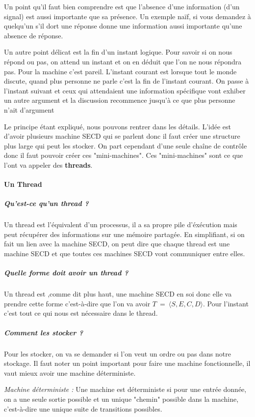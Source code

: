 \documentclass[10pt,a4paper]{article}
\begin{document}
				Un point qu'il faut bien comprendre est que l'absence d'une information (d'un signal) est aussi importante que sa présence. Un exemple naïf, si vous demandez à quelqu'un s'il dort une réponse donne une information aussi importante qu'une absence de réponse.
				\medbreak
					
				Un autre point délicat est la fin d'un instant logique. Pour savoir si on nous répond ou pas, on attend un instant et on en déduit que l'on ne nous répondra pas. Pour la machine c'est pareil. L'instant courant est lorsque tout le monde discute, quand plus personne ne parle c'est la fin de l'instant courant. On passe à l'instant suivant et ceux qui attendaient une information spécifique vont exhiber un autre argument et la discussion recommence jusqu'à ce que plus personne n'ait d'argument
				\medbreak
					
				Le principe étant expliqué, nous pouvons rentrer dans les détails. L'idée est d'avoir plusieurs machine SECD qui se parlent donc il faut créer une structure plus large qui peut les stocker. On part cependant d'une seule chaîne de contrôle donc il faut pouvoir créer ces "mini-machines". Ces "mini-machines" sont ce que l'ont va appeler des \textbf{threads}.
				\bigbreak
					
					
				\paragraph{Un Thread}
						
					\subparagraph{Qu'est-ce qu'un thread ?}
					Un thread est l'équivalent d'un processus, il a sa propre pile d'éxécution mais peut récupérer des informations sur une mémoire partagée. En simplifiant, si on fait un lien avec la machine SECD, on peut dire que chaque thread est une machine SECD et que toutes ces machines SECD vont communiquer entre elles.
						
					\subparagraph{Quelle forme doit avoir un thread ?} 
					Un thread est ,comme dit plus haut, une machine SECD en soi donc elle va prendre cette forme c'est-à-dire que l'on va avoir $T~=~\langle S,E,C,D\rangle$. Pour l'instant c'est tout ce qui nous est nécessaire dans le thread.
						
					\subparagraph{Comment les stocker ?}
					Pour les stocker, on va se demander si l'on veut un ordre ou pas dans notre stockage. Il faut noter un point important pour faire une machine fonctionnelle, il vaut mieux avoir une machine déterministe.
					\medbreak
						
					\textit{Machine déterministe :} Une machine est déterministe si pour une entrée donnée, on a une seule sortie possible et un unique "chemin" possible dans la machine, c'est-à-dire une unique suite de transitions possibles.
					\medbreak
						
\end{document}
